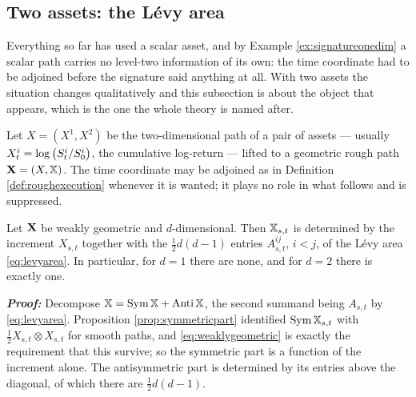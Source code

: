 \vspace{-0.5cm}

\subsection{Two assets: the L\'evy area}\label{subsec:levyarea}

\vspace{-0.3cm}

Everything so far has used a scalar asset, and by Example \ref{ex:signatureonedim} a scalar path
carries no level-two information of its own: the time coordinate had to be adjoined before the
signature said anything at all. With two assets the situation changes qualitatively and this subsection is about the object that appears, which is the one the
whole theory is named after.

Let $X=(X^{1},X^{2})$ be the two-dimensional path of a pair of assets --- usually
$X^{i}_{t}=\log \left( S^{i}_{t}/S^{i}_{0}\right)$, the cumulative log-return
--- lifted to a geometric rough path $\mathbf{X}=(X,\mathbb{X})$. The time coordinate may be adjoined as in
Definition \ref{def:roughexecution} whenever it is wanted; it plays no role in what follows and is
suppressed.



\begin{proposition}\label{prop:leveltwofree}
Let $\mathbf{X}$ be weakly geometric and $d$-dimensional. Then $\mathbb{X}_{s,t}$ is determined by the increment
$X_{s,t}$ together with the $\tfrac12 d(d-1)$ entries $A^{ij}_{s,t}$, $i<j$, of the L\'evy area
\eqref{eq:levyarea}. In particular, for $d=1$ there are none, and for $d=2$ there is exactly one.
\end{proposition}

\textbf{\textit{Proof:}} Decompose $\mathbb{X}=\operatorname{Sym}\mathbb{X}+\operatorname{Anti}\mathbb{X}$, the second summand being $A_{s,t}$ by
\eqref{eq:levyarea}. Proposition \ref{prop:symmetricpart} identified $\operatorname{Sym}\mathbb{X}_{s,t}$ with
$\tfrac12X_{s,t}\otimes X_{s,t}$ for smooth paths, and \eqref{eq:weaklygeometric} is exactly the
requirement that this survive; so the symmetric part is a function of the increment alone. The
antisymmetric part is determined by its entries above the diagonal, of which there are
$\tfrac12d(d-1)$. \qedfilledtext

\medskip

